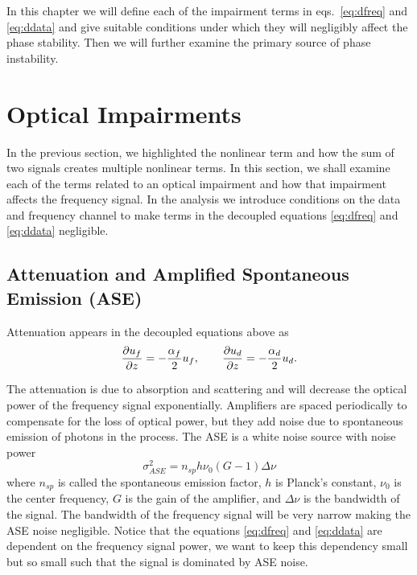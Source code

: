 In this chapter we will define each of the impairment terms in eqs.~\ref{eq:dfreq} and \ref{eq:ddata} and give suitable conditions under which they will negligibly affect the phase stability. Then we will further examine the primary source of phase instability.


\section{Optical Impairments} \label{sec:impair}

In the previous section, we highlighted the nonlinear term and how the sum of two signals creates multiple nonlinear terms. In this section, we shall examine each of the terms related to an optical impairment and how that impairment affects the frequency signal. In the analysis we introduce conditions on the data and frequency channel to make terms in the decoupled equations \ref{eq:dfreq} and \ref{eq:ddata} negligible. 

\subsection{Attenuation and Amplified Spontaneous Emission (ASE)}
%
Attenuation appears in the decoupled equations above as
%
\begin{equation*}
\frac{\partial u_f}{\partial z} = -\frac{\alpha_f}{2}u_f, \qquad \frac{\partial u_d}{\partial z} = -\frac{\alpha_d}{2}u_d.
\end{equation*}

The attenuation is due to absorption and scattering and will decrease the optical power of the frequency signal exponentially. Amplifiers are spaced periodically to compensate for the loss of optical power, but they add noise due to spontaneous emission of photons in the process.  The ASE is a white noise source with noise power \cite{agrawal2012fiber}
%
\begin{equation}
\sigma^2_{ASE} = n_{sp}h\nu_0 (G-1)\Delta\nu
\end{equation}
%
where $n_{sp}$ is called the spontaneous emission factor, $h$ is Planck's constant, $\nu_0$ is the center frequency, $G$ is the gain of the amplifier, and $\Delta\nu$ is the bandwidth of the signal. The bandwidth of the frequency signal will be very narrow making the ASE noise negligible. Notice that the equations \ref{eq:dfreq} and \ref{eq:ddata} are dependent on the frequency signal power, we want to keep this dependency small but so small such that the signal is dominated by ASE noise.

